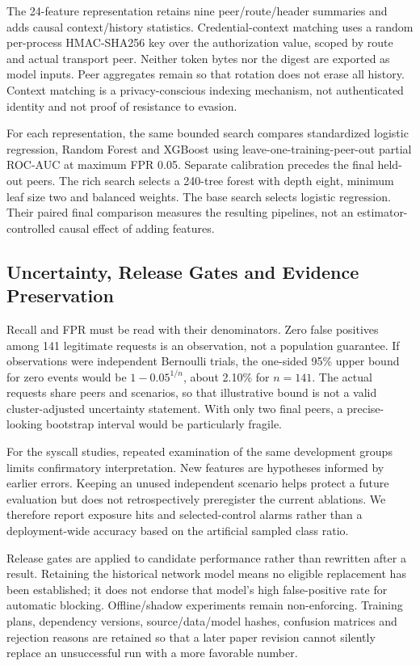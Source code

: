 \documentclass[conference,a4paper]{IEEEtran}
\begin{document}
The 24-feature representation retains nine peer/route/header summaries and adds causal context/history statistics. Credential-context matching uses a random per-process HMAC-SHA256 key over the authorization value, scoped by route and actual transport peer. Neither token bytes nor the digest are exported as model inputs. Peer aggregates remain so that rotation does not erase all history. Context matching is a privacy-conscious indexing mechanism, not authenticated identity and not proof of resistance to evasion.

For each representation, the same bounded search compares standardized logistic regression, Random Forest and XGBoost using leave-one-training-peer-out partial ROC-AUC at maximum FPR 0.05. Separate calibration precedes the final held-out peers. The rich search selects a 240-tree forest with depth eight, minimum leaf size two and balanced weights. The base search selects logistic regression. Their paired final comparison measures the resulting pipelines, not an estimator-controlled causal effect of adding features.

\subsection{Uncertainty, Release Gates and Evidence Preservation}
Recall and FPR must be read with their denominators. Zero false positives among 141 legitimate requests is an observation, not a population guarantee. If observations were independent Bernoulli trials, the one-sided 95\% upper bound for zero events would be $1-0.05^{1/n}$, about 2.10\% for $n=141$. The actual requests share peers and scenarios, so that illustrative bound is not a valid cluster-adjusted uncertainty statement. With only two final peers, a precise-looking bootstrap interval would be particularly fragile.

For the syscall studies, repeated examination of the same development groups limits confirmatory interpretation. New features are hypotheses informed by earlier errors. Keeping an unused independent scenario helps protect a future evaluation but does not retrospectively preregister the current ablations. We therefore report exposure hits and selected-control alarms rather than a deployment-wide accuracy based on the artificial sampled class ratio.

Release gates are applied to candidate performance rather than rewritten after a result. Retaining the historical network model means no eligible replacement has been established; it does not endorse that model's high false-positive rate for automatic blocking. Offline/shadow experiments remain non-enforcing. Training plans, dependency versions, source/data/model hashes, confusion matrices and rejection reasons are retained so that a later paper revision cannot silently replace an unsuccessful run with a more favorable number.
\end{document}
